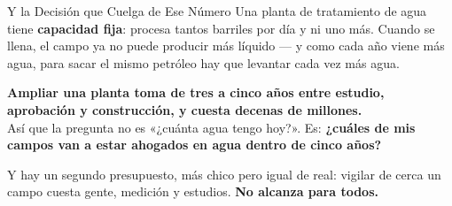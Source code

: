 \documentclass[aspectratio=169, 11pt]{beamer}
\begin{document}
\begin{frame}[shrink=8]{Y la Decisión que Cuelga de Ese Número}
  \vspace{4pt}
  {\footnotesize\color{textMuted}
   Una planta de tratamiento de agua tiene \textbf{capacidad fija}: procesa
   tantos barriles por día y ni uno más. Cuando se llena, el campo ya no puede
   producir más líquido --- y como cada año viene más agua, para sacar el mismo
   petróleo hay que levantar cada vez más agua.}
  \vspace{7pt}
  \begin{tcolorbox}[colback=arcaGray, colframe=arcaDark, boxrule=0pt,
    leftrule=4pt, arc=3pt, left=10pt, right=10pt, top=7pt, bottom=7pt]
    {\footnotesize\color{arcaDark}\bfseries
     Ampliar una planta \textbf{toma de tres a cinco años} entre estudio,
     aprobación y construcción, y cuesta decenas de millones.}\\[6pt]
    {\footnotesize\color{textMuted}
     Así que la pregunta no es «¿cuánta agua tengo hoy?». Es:
     \textbf{¿cuáles de mis campos van a estar ahogados en agua dentro de
     cinco años?}}
  \end{tcolorbox}
  \vspace{7pt}
  {\footnotesize\color{textMuted}
   Y hay un segundo presupuesto, más chico pero igual de real: vigilar de
   cerca un campo cuesta gente, medición y estudios. \textbf{No alcanza para
   todos.}}
\end{frame}
\end{document}
